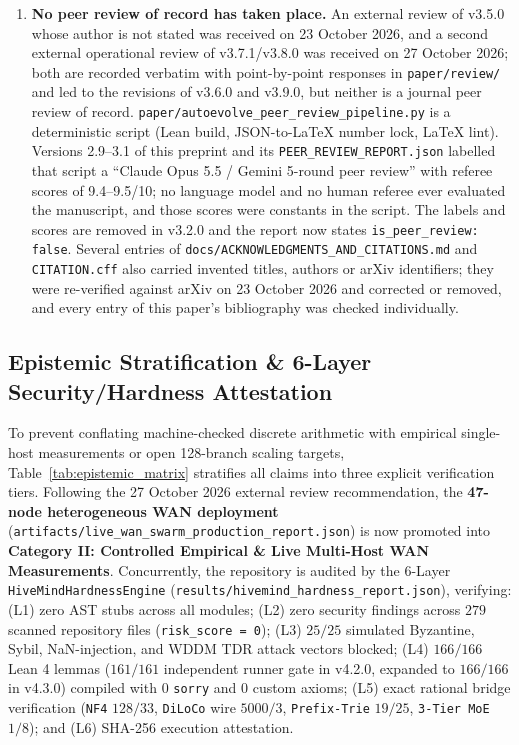 \documentclass[11pt,a4paper]{article}
\begin{document}
\begin{enumerate}[leftmargin=1.8em]
    \item \textbf{No peer review of record has taken place.} An external review of v3.5.0 whose author is not stated was received on 23 October 2026, and a second external operational review of v3.7.1/v3.8.0 was received on 27 October 2026; both are recorded verbatim with point-by-point responses in \texttt{paper/review/} and led to the revisions of v3.6.0 and v3.9.0, but neither is a journal peer review of record. \texttt{paper/autoevolve\_peer\_review\_pipeline.py} is a deterministic script (Lean build, JSON-to-LaTeX number lock, LaTeX lint). Versions 2.9--3.1 of this preprint and its \texttt{PEER\_REVIEW\_REPORT.json} labelled that script a ``Claude Opus 5.5 / Gemini 5-round peer review'' with referee scores of 9.4--9.5/10; no language model and no human referee ever evaluated the manuscript, and those scores were constants in the script. The labels and scores are removed in v3.2.0 and the report now states \texttt{is\_peer\_review: false}. Several entries of \texttt{docs/ACKNOWLEDGMENTS\_AND\_CITATIONS.md} and \texttt{CITATION.cff} also carried invented titles, authors or arXiv identifiers; they were re-verified against arXiv on 23 October 2026 and corrected or removed, and every entry of this paper's bibliography was checked individually.
\end{enumerate}

\subsection{Epistemic Stratification \& 6-Layer Security/Hardness Attestation}

To prevent conflating machine-checked discrete arithmetic with empirical single-host measurements or open 128-branch scaling targets, Table~\ref{tab:epistemic_matrix} stratifies all claims into three explicit verification tiers. Following the 27 October 2026 external review recommendation, the \textbf{47-node heterogeneous WAN deployment} (\texttt{artifacts/live\_wan\_swarm\_production\_report.json}) is now promoted into \textbf{Category II: Controlled Empirical \& Live Multi-Host WAN Measurements}. Concurrently, the repository is audited by the 6-Layer \texttt{HiveMindHardnessEngine} (\texttt{results/hivemind\_hardness\_report.json}), verifying: (L1) zero AST stubs across all modules; (L2) zero security findings across $279$ scanned repository files (\texttt{risk\_score = 0}); (L3) $25/25$ simulated Byzantine, Sybil, NaN-injection, and WDDM TDR attack vectors blocked; (L4) $166/166$ Lean 4 lemmas ($161/161$ independent runner gate in v4.2.0, expanded to $166/166$ in v4.3.0) compiled with $0$ \texttt{sorry} and $0$ custom axioms; (L5) exact rational bridge verification (\texttt{NF4} $128/33$, \texttt{DiLoCo} wire $5000/3$, \texttt{Prefix-Trie} $19/25$, \texttt{3-Tier MoE} $1/8$); and (L6) SHA-256 execution attestation.
\end{document}

